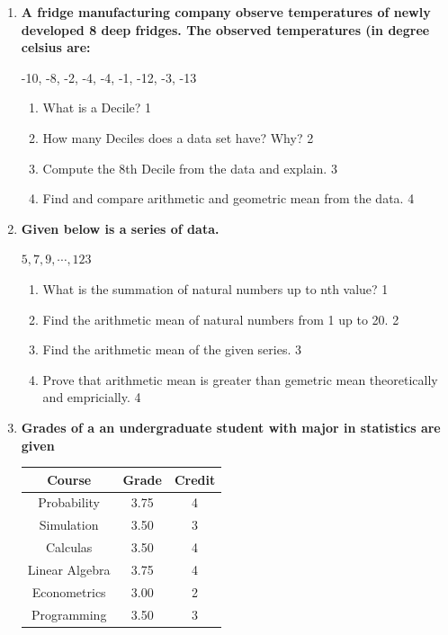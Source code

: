 \documentclass[a4paper,oneside]{book}
\begin{document}
\begin{enumerate}
   \item
	  \textbf{A fridge manufacturing company observe temperatures of newly developed 8 deep fridges. The observed temperatures (in degree celsius are:} 
	  
	    \begin{center}
-10, -8, -2, -4, -4, -1, -12, -3, -13
  \end{center}
  
  \begin{enumerate}
    \item
	What is a Decile? \hfill 1
    \item
	How many Deciles does a data set have? Why? \hfill 2
    \item  
	Compute the 8th Decile from the data and explain. \hfill 3
    \item
	Find and compare arithmetic and geometric mean from the data. \hfill 4
  \end{enumerate}
  
   \item
	  \textbf{Given below is a series of data.} 
	  
	  	    \begin{center}
	 $5, 7, 9, \cdots , 123$
	    \end{center}
  
  \begin{enumerate}
    \item
	What is the summation of natural numbers up to nth value? \hfill 1
    \item
	Find the arithmetic mean of natural numbers from 1 up to 20. \hfill 2
    \item  
	Find the arithmetic mean of the given series. \hfill 3
    \item
	Prove that arithmetic mean is greater than gemetric mean theoretically and empricially. \hfill 4
  \end{enumerate}
  
   \item
	  \textbf{Grades of a an undergraduate student with major in statistics are given} 

\begin{table}[h]
\centering
\begin{tabular}{c|c|c}
\hline
Course & Grade & Credit \\ \hline
Probability & 3.75 & 4 \\ 
Simulation & 3.50 & 3 \\ 
Calculas & 3.50 & 4 \\ 
Linear Algebra & 3.75 & 4 \\ 
Econometrics & 3.00 & 2 \\ 
Programming & 3.50 & 3 \\ \hline
\end{tabular}
\end{table}


\end{enumerate}
\end{document}
